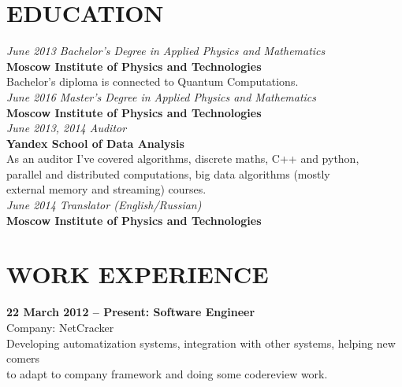 \documentclass[margin,12pt]{res}
\begin{document}
  \address{28a Pervomayskaya Street, Dolgoprudny\\
    valery.ovchinnikov@phystech.edu\\
    kremsnx@gmail.com\\
    +7 (985) 964-85-12}

\begin{resume}
\section{EDUCATION} 
\textit{June 2013 Bachelor's Degree in Applied Physics and
  Mathematics\\}
\textbf{Moscow Institute of Physics and Technologies}\\
Bachelor's diploma is connected to Quantum Computations.\\
\newline
\textit{June 2016 Master's Degree in Applied Physics and Mathematics\\}
\textbf{Moscow Institute of Physics and Technologies}\\
\newline
\textit{June 2013, 2014 Auditor\\}
\textbf{Yandex School of Data Analysis}\\
As an auditor I've covered algorithms, discrete maths, C++ and python,\\
 parallel and distributed computations, big data algorithms (mostly\\
 external memory and streaming) courses.\\
\newline
\textit{June 2014 Translator (English/Russian)\\}
\textbf{Moscow Institute of Physics and Technologies}\\
\section{WORK EXPERIENCE} 
\textbf{22 March 2012 -- Present: Software Engineer}\\
Company: NetCracker\\
Developing automatization systems, integration with other systems, helping new
comers\\
 to adapt to company framework and doing some codereview work.\\

\end{resume}
\end{document}
